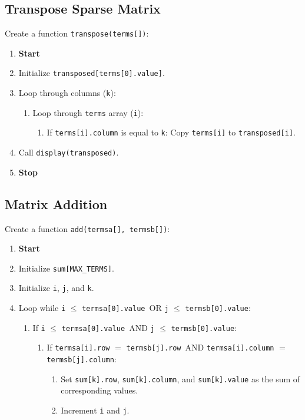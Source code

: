 {  \subsection{Transpose Sparse Matrix}
  Create a function \texttt{transpose(terms[])}:
  \begin{enumerate}
    \item \textbf{Start}
    \item Initialize \texttt{transposed[terms[0].value]}.
    \item Loop through columns (\texttt{k}):
          \begin{enumerate}[label=2.\arabic*.]
            \item Loop through \texttt{terms} array (\texttt{i}):
                  \begin{enumerate}[label=2.1.\arabic*.]
                    \item If \texttt{terms[i].column} is equal to \texttt{k}:
                          Copy \texttt{terms[i]} to \texttt{transposed[i]}.
                  \end{enumerate}
          \end{enumerate}
    \item Call \texttt{display(transposed)}.
    \item \textbf{Stop}
  \end{enumerate}

  \subsection{Matrix Addition}
  Create a function \texttt{add(termsa[], termsb[])}:
  \begin{enumerate}[label=\arabic*.,left=0pt]
    \item \textbf{Start}
    \item Initialize \texttt{sum[MAX\_TERMS]}.
    \item Initialize \texttt{i}, \texttt{j}, and \texttt{k}.
    \item Loop while \texttt{i} $\leq$ \texttt{termsa[0].value}\ OR \texttt{j} $\leq$ \texttt{termsb[0].value}:
          \begin{enumerate}[label=4.\arabic*.]
            \item If \texttt{i} $\leq$ \texttt{termsa[0].value}\ AND \texttt{j} $\leq$ \texttt{termsb[0].value}:
                  \begin{enumerate}[label=4.1.\arabic*.]
                    \item If \texttt{termsa[i].row} $=$ \texttt{termsb[j].row}\ AND \texttt{termsa[i].column} $=$ \texttt{termsb[j].column}:
                          \begin{enumerate}[label=4.1.1.\arabic*.]
                            \item Set \texttt{sum[k].row}, \texttt{sum[k].column}, and \texttt{sum[k].value} as the sum of corresponding \newline values.
                            \item Increment \texttt{i} and \texttt{j}.
                          \end{enumerate}


\end{enumerate}
\end{enumerate}
\end{enumerate}}
